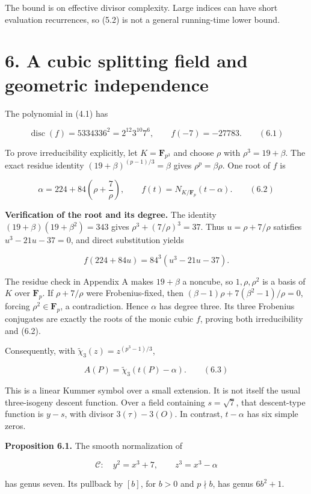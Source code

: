 \documentclass[
  11pt,
  a4paper,
]{article}
\begin{document}
The bound is on effective divisor complexity. Large indices can have
short evaluation recurrences, so (5.2) is not a general running-time
lower bound.

\section{6. A cubic splitting field and geometric
independence}\label{a-cubic-splitting-field-and-geometric-independence}

The polynomial in (4.1) has

\[
\operatorname{disc}(f)=5334336^2=2^{12}3^{10}7^6,
\qquad f(-7)=-27783. \qquad (6.1)
\]

To prove irreducibility explicitly, let \(K=\mathbf F_{p^3}\) and choose
\(\rho\) with \(\rho^3=19+\beta\). The exact residue identity
\((19+\beta)^{(p-1)/3}=\beta\) gives \(\rho^p=\beta\rho\). One root of
\(f\) is

\[
\alpha=224+84\left(\rho+\frac7\rho\right),\qquad
f(t)=N_{K/\mathbf F_p}(t-\alpha). \qquad (6.2)
\]

\textbf{Verification of the root and its degree.} The identity
\((19+\beta)(19+\beta^2)=343\) gives \(\rho^3+(7/\rho)^3=37\). Thus
\(u=\rho+7/\rho\) satisfies \(u^3-21u-37=0\), and direct substitution
yields

\[
f(224+84u)=84^3(u^3-21u-37).
\]

The residue check in Appendix A makes \(19+\beta\) a noncube, so
\(1,\rho,\rho^2\) is a basis of \(K\) over \(\mathbf F_p\). If
\(\rho+7/\rho\) were Frobenius-fixed, then
\((\beta-1)\rho+7(\beta^2-1)/\rho=0\), forcing \(\rho^2\in\mathbf F_p\),
a contradiction. Hence \(\alpha\) has degree three. Its three Frobenius
conjugates are exactly the roots of the monic cubic \(f\), proving both
irreducibility and (6.2).

Consequently, with \(\widetilde\chi_3(z)=z^{(p^3-1)/3}\),

\[
A(P)=\widetilde\chi_3(t(P)-\alpha). \qquad (6.3)
\]

This is a linear Kummer symbol over a small extension. It is not itself
the usual three-isogeny descent function. Over a field containing
\(s=\sqrt7\), that descent-type function is \(y-s\), with divisor
\(3(\tau)-3(O)\). In contrast, \(t-\alpha\) has six simple zeros.

\textbf{Proposition 6.1.} The smooth normalization of

\[
\mathcal C:\quad y^2=x^3+7,\qquad z^3=x^3-\alpha
\]

has genus seven. Its pullback by \([b]\), for \(b>0\) and \(p\nmid b\),
has genus \(6b^2+1\).
\end{document}
